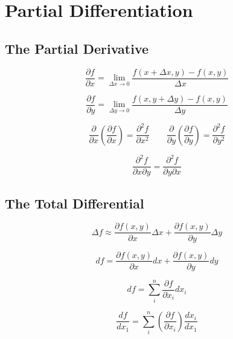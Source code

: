 \chapter{Partial Differentiation}

\section{The Partial Derivative}

\begin{equation*}
    \frac{\partial f}{\partial x} = \lim_{\Delta x \to 0}\frac{f(x + \Delta x, y) - f(x, y)}{\Delta x}
\end{equation*}

\begin{equation*}
    \frac{\partial f}{\partial y} = \lim_{\Delta y \to 0}\frac{f(x, y + \Delta y) - f(x, y)}{\Delta y}
\end{equation*}

\[\frac{\partial}{\partial x}\left(\frac{\partial f}{\partial x}\right) = \frac{\partial^{2}f}{\partial x ^{2}} \qquad \frac{\partial}{\partial y}\left(\frac{\partial f}{\partial y}\right) = \frac{\partial^{2}f}{\partial y ^{2}}\]

\begin{equation*}
    \frac{\partial^{2}f}{\partial x \partial y} = \frac{\partial^{2}f}{\partial y \partial x}
\end{equation*}

\section{The Total Differential}

\begin{equation*}
    \Delta f \approx \frac{\partial f(x, y)}{\partial x}\Delta x + \frac{\partial f(x, y)}{\partial y}\Delta y
\end{equation*}

\begin{equation*}
    df = \frac{\partial f(x, y)}{\partial x}dx + \frac{\partial f(x, y)}{\partial y}dy
\end{equation*}

\begin{equation*}
    df = \sum_{i}^{n}\frac{\partial f}{\partial x_{i}}dx_{i}
\end{equation*}

\begin{equation*}
    \frac{df}{dx_{1}} = \sum_{i}^{n}\left(\frac{\partial f}{\partial x_{i}}\right)\frac{dx_{i}}{dx_{1}}
\end{equation*}

